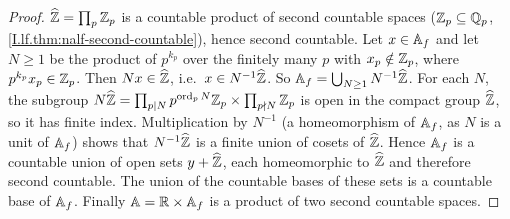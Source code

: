 \begin{theorem}
\end{theorem}
\begin{proof}
$\widehat{\mathbb{Z}}=\prod_p\mathbb{Z}_p$ is a countable product of second countable spaces ($\mathbb{Z}_p\subseteq\mathbb{Q}_p$,
\cref{I.lf.thm:nalf-second-countable}), hence second countable. Let $x\in\mathbb{A}_f$ and let $N\ge1$ be the product of
$p^{k_p}$ over the finitely many $p$ with $x_p\notin\mathbb{Z}_p$, where $p^{k_p}x_p\in\mathbb{Z}_p$. Then $Nx\in\widehat{\mathbb{Z}}$, i.e.\
$x\in N^{-1}\widehat{\mathbb{Z}}$. So $\mathbb{A}_f=\bigcup_{N\ge1}N^{-1}\widehat{\mathbb{Z}}$. For each $N$, the subgroup $N\widehat{\mathbb{Z}}=\prod_{p\mid N}p^{\operatorname{ord}_p N}\mathbb{Z}_p\times\prod_{p\nmid N}\mathbb{Z}_p$
is open in the compact group $\widehat{\mathbb{Z}}$, so it has finite index. Multiplication by $N^{-1}$ (a homeomorphism of $\mathbb{A}_f$, as
$N$ is a unit of $\mathbb{A}_f$) shows that $N^{-1}\widehat{\mathbb{Z}}$ is a finite union of cosets of $\widehat{\mathbb{Z}}$. Hence $\mathbb{A}_f$ is a countable
union of open sets $y+\widehat{\mathbb{Z}}$, each homeomorphic to $\widehat{\mathbb{Z}}$ and therefore second countable. The union of the countable
bases of these sets is a countable base of $\mathbb{A}_f$. Finally $\mathbb{A}=\mathbb{R}\times\mathbb{A}_f$ is a product of two second countable spaces.
\end{proof}

